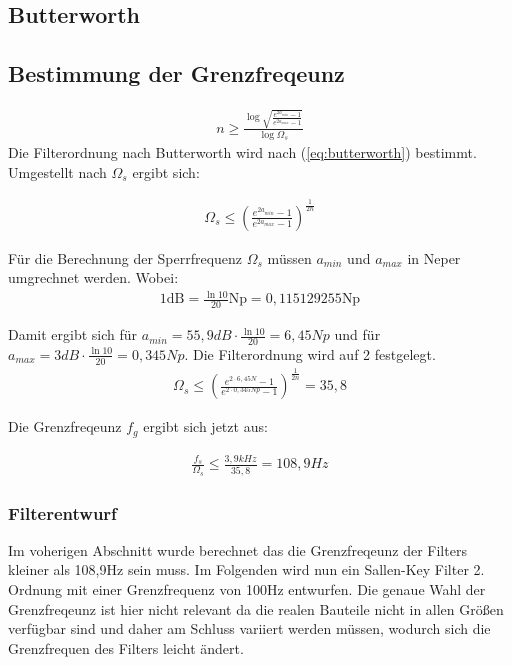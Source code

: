 \subsection{Butterworth}
\subsection{Bestimmung der Grenzfreqeunz}
\begin{align}
n \ge \frac{\log{\sqrt{\frac{e^{2a_{min}}-1}{e^{2a_{max}}-1}}}}{\log{\Omega_s}}
\label{eq:butterworth}
\end{align}
Die Filterordnung nach Butterworth wird nach (\ref{eq:butterworth}) bestimmt. Umgestellt nach $\Omega_s$ ergibt sich:

\begin{align}
\Omega_s \le  \left(\frac{e^{2a_{min}}-1}{e^{2a_{max}}-1}\right)^{\frac{1}{2n}}
\end{align}



Für die Berechnung der Sperrfrequenz $\Omega_s$ müssen  $a_{min}$ und $a_{max}$ in Neper umgrechnet werden. Wobei:
\begin{align*}
1 \text{dB} =  \frac{\ln{10}}{20}\text{Np} = 0,115129255 \text{Np}   
\end{align*}

Damit ergibt sich für $a_{min}=55,9 dB\cdot \frac{\ln{10}}{20}=6,45Np$ und für  $a_{max}=3 dB\cdot \frac{\ln{10}}{20}=0,345Np$. Die Filterordnung wird auf 2 festgelegt.
\begin{align}
\Omega_s \le  \left(\frac{e^{2\cdot6,45N }-1}{e^{2\cdot 0,345Np}-1}\right)^{\frac{1}{2n}}  = 35,8
\end{align}

Die Grenzfreqeunz $f_g$ ergibt sich jetzt aus:

\begin{align}
\frac{f_s}{\Omega_s} \le \frac{3,9kHz}{35,8} = 108,9Hz
\end{align}

\subsubsection{Filterentwurf}
Im voherigen Abschnitt wurde berechnet das die Grenzfreqeunz der Filters kleiner als 108,9Hz sein muss.
Im Folgenden wird nun ein Sallen-Key Filter 2. Ordnung mit einer Grenzfrequenz von 100Hz entwurfen.
Die genaue Wahl der Grenzfreqeunz ist hier nicht relevant da die realen Bauteile nicht in  allen Größen 
verfügbar sind und daher am Schluss variiert werden müssen, wodurch sich die Grenzfrequen des Filters leicht ändert.


